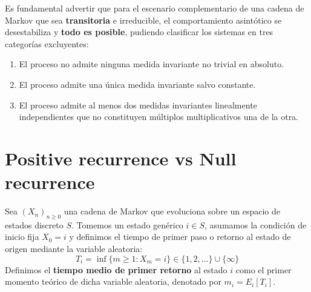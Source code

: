 \documentclass[10pt]{book}
\begin{document}

\begin{observacion}
    Es fundamental advertir que para el escenario complementario de una cadena de Markov que sea \textbf{transitoria} e irreducible, el comportamiento asintótico se desestabiliza y \textbf{todo es posible}, pudiendo clasificar los sistemas en tres categorías excluyentes:
    \begin{enumerate}
        \item El proceso no admite ninguna medida invariante no trivial en absoluto.
        \item El proceso admite una única medida invariante salvo constante.
        \item El proceso admite al menos dos medidas invariantes linealmente independientes que no constituyen múltiplos multiplicativos una de la otra.
    \end{enumerate}
\end{observacion}

\section{Positive recurrence vs Null recurrence}

Sea $(X_n)_{n \geq 0}$ una cadena de Markov que evoluciona sobre un espacio de estados discreto $S$. Tomemos un estado genérico $i \in S$, asumamos la condición de inicio fija $X_0 = i$ y definimos el tiempo de primer paso o retorno al estado de origen mediante la variable aleatoria:
\[
T_i = \inf \{m \geq 1 : X_m = i\} \in \{1, 2, \dots\} \cup \{\infty\}
\]
Definimos el \textbf{tiempo medio de primer retorno} al estado $i$ como el primer momento teórico de dicha variable aleatoria, denotado por $m_i = E_i[T_i]$. \\
\end{document}
